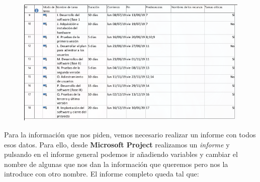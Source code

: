 \documentclass[11pt,letterpaper,onecolumn]{article}
\begin{document}
\begin{figure}[H]
\begin{center}
    \includegraphics[scale=0.9]{actividad2.png}
\end{center}
\label{fig:}
\end{figure}


Para la información que nos piden, vemos necesario realizar un informe con todos esos datos. Para ello, desde \textbf{Microsoft Project} realizamos un \textit{informe} y pulsando en el informe general podemos ir añadiendo variables y cambiar el nombre de algunas que nos dan la información que queremos pero nos la introduce con otro nombre. El informe completo queda tal que:
\end{document}
